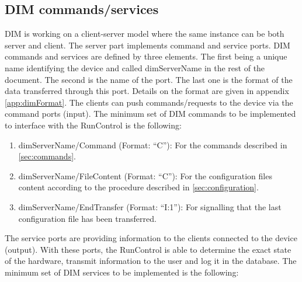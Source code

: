 \documentclass[a4paper]{article}
\begin{document}
\subsection{DIM commands/services} \label{sec:DIM}
DIM is working on a client-server model where the same instance can be both server and client.
The server part implements command and service ports. DIM commands and
services are defined by three elements. The first being a unique name
identifying the device and called dimServerName in the rest of the document.
The second is the name of the port. The last one is the format of the data
transferred through this port. Details on the format are given in appendix
\ref{app:dimFormat}. The clients can push commands/requests to the device via
the command ports (input). The minimum set of DIM commands to be implemented to
interface with the RunControl is the following:
\begin{enumerate}[label=\textbf{CMD.\arabic*}]
	\item \label{cmd:command} dimServerName/Command (Format: ``C''): For the commands described in
	\ref{sec:commands}.
	\item \label{cmd:fileContent} dimServerName/FileContent (Format: ``C''): For the configuration
	files content according to the procedure described in \ref{sec:configuration}.
	\item \label{cmd:endTransfer} dimServerName/EndTransfer (Format: ``I:1''): For
	signalling that the last configuration file has been transferred.
\end{enumerate}
The service ports are providing information to the clients connected to the device (output).
With these ports, the RunControl is able to determine the exact state of the hardware,
transmit information to the user and log it in the database. The minimum set of DIM services to
be implemented is the following:
\end{document}
